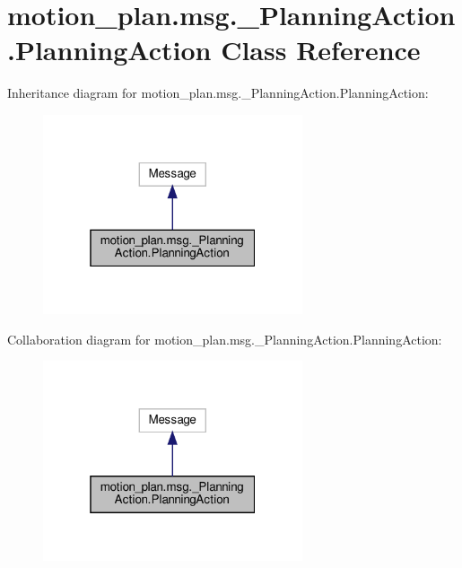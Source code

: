 \hypertarget{classmotion__plan_1_1msg_1_1__PlanningAction_1_1PlanningAction}{}\section{motion\+\_\+plan.\+msg.\+\_\+\+Planning\+Action.\+Planning\+Action Class Reference}
\label{classmotion__plan_1_1msg_1_1__PlanningAction_1_1PlanningAction}


Inheritance diagram for motion\+\_\+plan.\+msg.\+\_\+\+Planning\+Action.\+Planning\+Action\+:
\nopagebreak
\begin{figure}[H]
\begin{center}
\leavevmode
\includegraphics[width=217pt]{classmotion__plan_1_1msg_1_1__PlanningAction_1_1PlanningAction__inherit__graph}
\end{center}
\end{figure}


Collaboration diagram for motion\+\_\+plan.\+msg.\+\_\+\+Planning\+Action.\+Planning\+Action\+:
\nopagebreak
\begin{figure}[H]
\begin{center}
\leavevmode
\includegraphics[width=217pt]{classmotion__plan_1_1msg_1_1__PlanningAction_1_1PlanningAction__coll__graph}
\end{center}
\end{figure}
